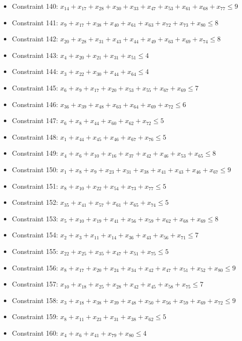 \documentclass[11pt]{article}
\begin{document}
\begin{itemize}
\item Constraint 140: $x_{14} + x_{17} + x_{28} + x_{30} + x_{33} + x_{47} + x_{53} + x_{61} + x_{68} + x_{77} \le 9$
\item Constraint 141: $x_{9} + x_{17} + x_{38} + x_{40} + x_{61} + x_{63} + x_{72} + x_{73} + x_{80} \le 8$
\item Constraint 142: $x_{20} + x_{28} + x_{31} + x_{43} + x_{44} + x_{49} + x_{63} + x_{69} + x_{74} \le 8$
\item Constraint 143: $x_{4} + x_{20} + x_{21} + x_{31} + x_{51} \le 4$
\item Constraint 144: $x_{3} + x_{22} + x_{30} + x_{44} + x_{64} \le 4$
\item Constraint 145: $x_{6} + x_{9} + x_{17} + x_{20} + x_{53} + x_{55} + x_{67} + x_{69} \le 7$
\item Constraint 146: $x_{36} + x_{39} + x_{48} + x_{63} + x_{64} + x_{69} + x_{72} \le 6$
\item Constraint 147: $x_{6} + x_{8} + x_{44} + x_{60} + x_{62} + x_{72} \le 5$
\item Constraint 148: $x_{1} + x_{44} + x_{45} + x_{46} + x_{67} + x_{76} \le 5$
\item Constraint 149: $x_{4} + x_{6} + x_{10} + x_{16} + x_{37} + x_{42} + x_{46} + x_{53} + x_{65} \le 8$
\item Constraint 150: $x_{1} + x_{8} + x_{9} + x_{23} + x_{31} + x_{38} + x_{41} + x_{43} + x_{46} + x_{67} \le 9$
\item Constraint 151: $x_{8} + x_{10} + x_{22} + x_{54} + x_{73} + x_{77} \le 5$
\item Constraint 152: $x_{35} + x_{41} + x_{57} + x_{61} + x_{65} + x_{74} \le 5$
\item Constraint 153: $x_{5} + x_{10} + x_{19} + x_{41} + x_{56} + x_{59} + x_{62} + x_{68} + x_{69} \le 8$
\item Constraint 154: $x_{2} + x_{3} + x_{11} + x_{14} + x_{36} + x_{43} + x_{56} + x_{71} \le 7$
\item Constraint 155: $x_{22} + x_{25} + x_{35} + x_{47} + x_{51} + x_{75} \le 5$
\item Constraint 156: $x_{8} + x_{17} + x_{20} + x_{24} + x_{34} + x_{42} + x_{47} + x_{51} + x_{52} + x_{80} \le 9$
\item Constraint 157: $x_{10} + x_{18} + x_{25} + x_{28} + x_{42} + x_{45} + x_{58} + x_{75} \le 7$
\item Constraint 158: $x_{3} + x_{18} + x_{38} + x_{39} + x_{48} + x_{50} + x_{56} + x_{59} + x_{69} + x_{72} \le 9$
\item Constraint 159: $x_{8} + x_{11} + x_{23} + x_{31} + x_{38} + x_{62} \le 5$
\item Constraint 160: $x_{4} + x_{6} + x_{41} + x_{79} + x_{80} \le 4$
\end{itemize}
\end{document}
